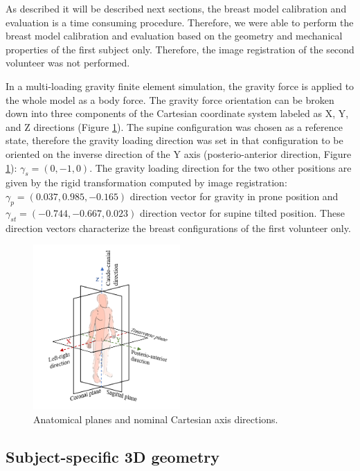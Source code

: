 As described it will be described next sections, the breast model calibration and evaluation is a time consuming procedure. Therefore, we were able to perform the breast model calibration and evaluation based on the geometry and mechanical properties of the first subject only. Therefore, the image registration of the second volunteer was not performed.

In a multi-loading gravity finite element simulation, the gravity force is applied to the whole model as a body force. The gravity force orientation can be broken down into three components of the Cartesian coordinate system labeled as X, Y, and Z directions (Figure \ref{fig:xyz_axis_directions}). The supine configuration was chosen as a reference state, therefore the gravity loading direction was set in that configuration to be oriented on the inverse direction of the Y axis (posterio-anterior direction, Figure \ref{fig:xyz_axis_directions}): $\gamma_s = (0,-1,0)$.   The gravity loading direction for the two other positions are given by the rigid transformation computed by image registration: $\gamma_p = (0.037, 0.985, -0.165)$ direction vector for gravity in prone position and $\gamma_{st} = (-0.744 , -0.667, 0.023)$ direction vector for supine tilted position. These direction vectors characterize the breast configurations of the first volunteer only.

\begin{figure}[!ht]
\centering
\includegraphics[width=0.5\textwidth,keepaspectratio]{figures/xyz_axis_directions.png} 
\caption{Anatomical planes and nominal Cartesian axis directions.}\label{fig:xyz_axis_directions}
\end{figure}

\subsection{Subject-specific 3D geometry}\label{subsection:patientspecificgeometry}

